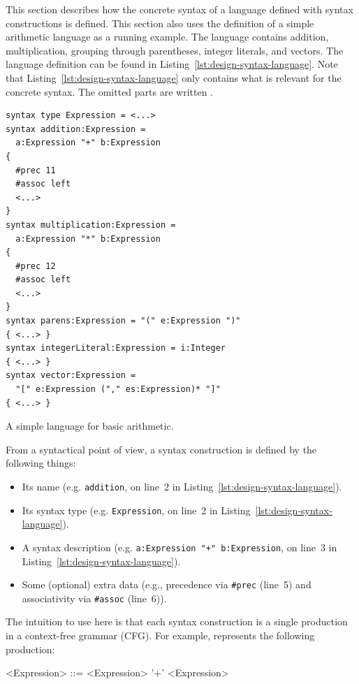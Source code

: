 \documentclass{kththesis}
\begin{document}
This section describes how the concrete syntax of a language defined with syntax constructions is defined. This section also uses the definition of a simple arithmetic language as a running example. The language contains addition, multiplication, grouping through parentheses, integer literals, and vectors. The language definition can be found in Listing~\ref{lst:design-syntax-language}. Note that Listing~\ref{lst:design-syntax-language} only contains what is relevant for the concrete syntax. The omitted parts are written .

\begin{listing}[t]
\begin{verbatim}
syntax type Expression = <...>
syntax addition:Expression =
  a:Expression "+" b:Expression
{
  #prec 11
  #assoc left
  <...>
}
syntax multiplication:Expression =
  a:Expression "*" b:Expression
{
  #prec 12
  #assoc left
  <...>
}
syntax parens:Expression = "(" e:Expression ")"
{ <...> }
syntax integerLiteral:Expression = i:Integer
{ <...> }
syntax vector:Expression =
  "[" e:Expression ("," es:Expression)* "]"
{ <...> }
\end{verbatim}
\caption{A simple language for basic arithmetic.}
\label{lst:design-syntax-language}
\end{listing}

From a syntactical point of view, a syntax construction is defined by the following things:
\begin{itemize}
  \item Its name (e.g. \texttt{addition}, on line~2 in Listing~\ref{lst:design-syntax-language}).
  \item Its syntax type (e.g. \texttt{Expression}, on line~2 in Listing~\ref{lst:design-syntax-language}).
  \item A syntax description (e.g. \texttt{a:Expression "+" b:Expression}, on line~3 in Listing~\ref{lst:design-syntax-language}).
  \item Some (optional) extra data (e.g., precedence via \texttt{#prec} (line~5) and associativity via \texttt{#assoc} (line~6)).
\end{itemize}

The intuition to use here is that each syntax construction is a single production in a context-free grammar (CFG). For example,  represents the following production:

\setlength{\grammarindent}{8em}
\begin{grammar}
<Expression> ::= <Expression> '+' <Expression>
\end{grammar}
\end{document}
